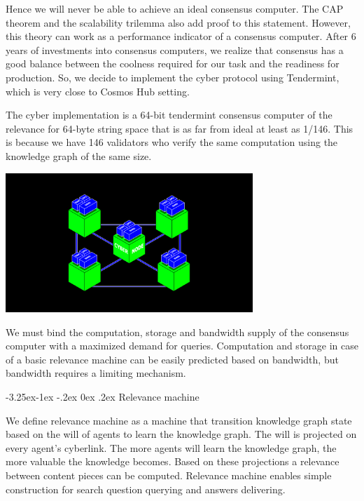 \documentclass[8pt,oneside]{amsart}
\makeatletter
\newcommand{\linkgreen}[2]{\href{#1}{\color{green}{#2}}}
\renewcommand\subsection{\@startsection{subsection}{2}{\z@}%
                                     {-3.25ex\@plus -1ex \@minus -.2ex}%
                                     {0ex \@plus .2ex}%
                                     {\play\Large}}%
\newcommand{\titleSection}[1]{\subsection{#1}}
\newcommand{\code}[1]{{\PlayBold #1}}
\newenvironment{Figure}
  {\par\medskip\noindent\minipage{\linewidth}}
  {\endminipage\par\medskip}
\makeatother
\begin{document}
Hence we will never be able to achieve an ideal consensus computer. The CAP theorem and the scalability trilemma also add proof to this statement. However, this theory can work as a performance indicator of a consensus computer. After 6 years of investments into consensus computers, we realize that \linkgreen{https://ipfs.io/ipfs/QmaMtD7xDgghqgjN62zWZ5TBGFiEjGQtuZBjJ9sMh816KJ}{Tendermint} consensus has a good balance between the coolness required for our task and the readiness for production. So, we decide to implement the \code{cyber} protocol using Tendermint, which is very close to Cosmos Hub setting.

The \code{cyber} implementation is a 64-bit tendermint consensus computer of the relevance for 64-byte string space that is as far from ideal at least as 1/146. This is because we have 146 validators who verify the same computation using the knowledge graph of the same size.

\begin{Figure}
  \centering
  \includegraphics[width=0.7\textwidth]{computer.png}
\end{Figure}

We must bind the computation, storage and bandwidth supply of the consensus computer with a maximized demand for queries. Computation and storage in case of a basic relevance machine can be easily predicted based on bandwidth, but bandwidth requires a limiting mechanism.

\titleSection{Relevance machine}\label{relevance-machine}

We define relevance machine as a machine that transition knowledge graph state based on the will of agents to learn the knowledge graph. The will is projected on every agent's cyberlink. The more agents will learn the knowledge graph, the more valuable the knowledge becomes. Based on these projections a relevance between content pieces can be computed. Relevance machine enables simple construction for search question querying and answers delivering.
\end{document}
